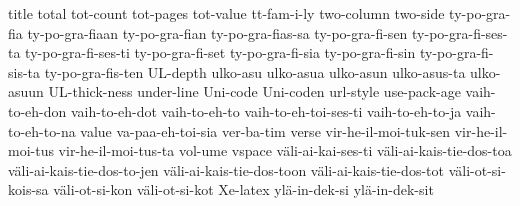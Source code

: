 {  title
  total
  tot-count
  tot-pages
  tot-value
  tt-fam-i-ly
  two-column
  two-side
  ty-po-gra-fia
  ty-po-gra-fiaan
  ty-po-gra-fian
  ty-po-gra-fias-sa
  ty-po-gra-fi-sen
  ty-po-gra-fi-ses-ta
  ty-po-gra-fi-ses-ti
  ty-po-gra-fi-set
  ty-po-gra-fi-sia
  ty-po-gra-fi-sin
  ty-po-gra-fi-sis-ta
  ty-po-gra-fis-ten
  UL-depth
  ulko-asu
  ulko-asua
  ulko-asun
  ulko-asus-ta
  ulko-asuun
  UL-thick-ness
  under-line
  Uni-code
  Uni-coden
  url-style
  use-pack-age
  vaih-to-eh-don
  vaih-to-eh-dot
  vaih-to-eh-to
  vaih-to-eh-toi-ses-ti
  vaih-to-eh-to-ja
  vaih-to-eh-to-na
  value
  va-paa-eh-toi-sia
  ver-ba-tim
  verse
  vir-he-il-moi-tuk-sen
  vir-he-il-moi-tus
  vir-he-il-moi-tus-ta
  vol-ume
  vspace
  väli-ai-kai-ses-ti
  väli-ai-kais-tie-dos-toa
  väli-ai-kais-tie-dos-to-jen
  väli-ai-kais-tie-dos-toon
  väli-ai-kais-tie-dos-tot
  väli-ot-si-kois-sa
  väli-ot-si-kon
  väli-ot-si-kot
  Xe-latex
  ylä-in-dek-si
  ylä-in-dek-sit
}
